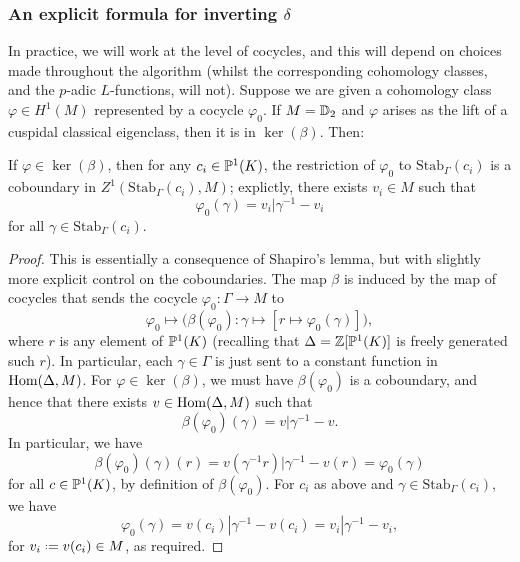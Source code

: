 \documentclass[a4paper,11pt]{article}
\numberwithin{equation}{section}
\begin{document}
\subsubsection{An explicit formula for inverting $\delta$}
In practice, we will work at the level of cocycles, and this will depend on choices made throughout the algorithm (whilst the corresponding cohomology classes, and the $p$-adic $L$-functions, will not). Suppose we are given a cohomology class $\varphi \in H^1(M)$ represented by a cocycle $\varphi_0$. If $M = \mathbb{D}_2$ and $\varphi$ arises as the lift of a cuspidal classical eigenclass, then it is in $\ker(\beta)$. Then:

\begin{proposition}\label{prop:stab coboundaries}
If $\varphi \in \ker(\beta)$, then for any $c_i \in \mathbb{P}^1(K)$, the restriction of $\varphi_0$ to $\mathrm{Stab}_\Gamma(c_i)$ is a coboundary in $Z^1(\mathrm{Stab}_\Gamma(c_i),M)$; explictly, there exists $v_i \in M$ such that
\[
	\varphi_0(\gamma) = v_i|\gamma^{-1} - v_i
\]
for all $\gamma \in \mathrm{Stab}_\Gamma(c_i)$.
\end{proposition}
\begin{proof}
	This is essentially a consequence of Shapiro's lemma, but with slightly more explicit control on the coboundaries. The map $\beta$ is induced by the map of cocycles that sends the cocycle $\varphi_0 : \Gamma \to M$ to
	\[
		\varphi_0 \longmapsto \bigg(\beta\left(\varphi_0\right) : \gamma \mapsto \left[r \mapsto \varphi_0(\gamma)\right]\bigg),
	\]
	where $r$ is any element of $\mathbb{P}^1(K)$ (recalling that $\Delta = \mathbb{Z}[\mathbb{P}^1(K)]$ is freely generated such $r$). In particular, each $\gamma \in \Gamma$ is just sent to a constant function in $\mathrm{Hom}(\Delta,M)$. For $\varphi \in \ker(\beta)$, we must have $\beta(\varphi_0)$ is a coboundary, and hence that there exists $v \in \mathrm{Hom}(\Delta,M)$ such that
	\[
		\beta(\varphi_0)(\gamma) = v|\gamma^{-1} - v.
	\]
	In particular, we have
	\[
		\beta(\varphi_0)(\gamma)(r) = v(\gamma^{-1} r)|\gamma^{-1} - v(r) = \varphi_0(\gamma)
	\]
	for all $c \in \mathbb{P}^1(K)$, by definition of $\beta(\varphi_0)$. For $c_i$ as above and $\gamma \in \mathrm{Stab}_\Gamma(c_i)$, we have
	\[
		\varphi_0(\gamma) = v(c_i)|\gamma^{-1} - v(c_i) = v_i|\gamma^{-1} - v_i,
	\]
	for $v_i \defeq v(c_i) \in M$, as required.
\end{proof}
\end{document}
